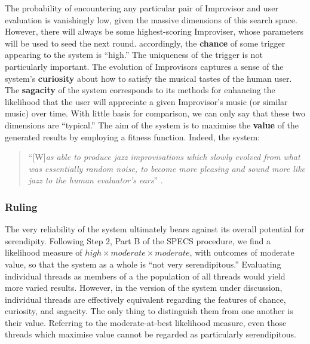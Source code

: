 The probability of encountering any particular pair of Improvisor and
user evaluation is vanishingly low, given the massive dimensions of
this search space.  However, there will always be some highest-scoring
Improviser, whose parameters will be used to seed the next round.
accordingly, the \textbf{chance} of some trigger appearing to the
system is ``high.''  The uniqueness of the trigger is not particularly
important.  The evolution of Improvisors captures a sense of the
system's \textbf{curiosity} about how to satisfy the musical tastes of
the human user.  The \textbf{sagacity} of the system corresponds to its
methods for enhancing the likelihood that the user will appreciate a
given Improvisor's music (or similar music) over time.  With little
basis for comparison, we can only say that these two dimensions are
``typical.''  The aim of the system is to maximise the \textbf{value}
of the generated results by employing a fitness function.  Indeed,
the system:
\begin{quote}
``{[}W{]}\emph{as able to produce jazz improvisations which slowly
    evolved from what was essentially random noise, to become more
    pleasing and sound more like jazz to the human evaluator's ears}''
  \cite{jordanous10}.
\end{quote}

\subsubsection{Ruling}
The very reliability of the system ultimately bears against its
overall potential for serendipity.  Following Step 2, Part B of the
SPECS procedure, we find a likelihood measure of
$\mathit{high}\times\mathit{moderate}\times\mathit{moderate}$, with
outcomes of moderate value, so that the system as a whole is ``not
very serendipitous.''  Evaluating individual threads as members of a
the population of all threads would yield more varied results.
However, in the version of the system under discussion, individual
threads are effectively equivalent regarding the features of chance,
curiosity, and sagacity.  The only thing to distinguish them from one
another is their value.  Referring to the moderate-at-best likelihood
measure, even those threads which maximise value cannot be regarded as
particularly serendipitous.

